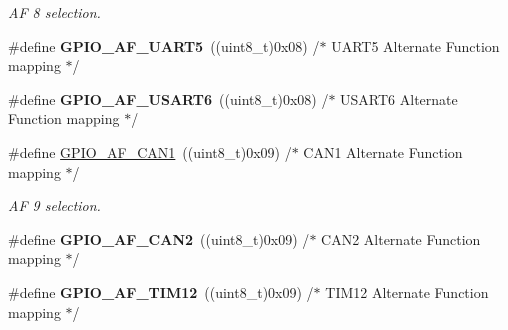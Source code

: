 \begin{DoxyCompactItemize}
\begin{DoxyCompactList}\small\item\em A\-F 8 selection. \end{DoxyCompactList}\item 
\hypertarget{group___g_p_i_o___alternat__function__selection__define_ga6250acb0f2f3de33bc8e78615852cc48}{\#define {\bfseries G\-P\-I\-O\-\_\-\-A\-F\-\_\-\-U\-A\-R\-T5}~((uint8\-\_\-t)0x08)  /$\ast$ U\-A\-R\-T5 Alternate Function mapping $\ast$/}\label{group___g_p_i_o___alternat__function__selection__define_ga6250acb0f2f3de33bc8e78615852cc48}

\item 
\hypertarget{group___g_p_i_o___alternat__function__selection__define_gaf69942861848b5175369145ffc001c41}{\#define {\bfseries G\-P\-I\-O\-\_\-\-A\-F\-\_\-\-U\-S\-A\-R\-T6}~((uint8\-\_\-t)0x08)  /$\ast$ U\-S\-A\-R\-T6 Alternate Function mapping $\ast$/}\label{group___g_p_i_o___alternat__function__selection__define_gaf69942861848b5175369145ffc001c41}

\item 
\hypertarget{group___g_p_i_o___alternat__function__selection__define_gaf5defeedc302bf348e31dd7bdcdd882f}{\#define \hyperlink{group___g_p_i_o___alternat__function__selection__define_gaf5defeedc302bf348e31dd7bdcdd882f}{G\-P\-I\-O\-\_\-\-A\-F\-\_\-\-C\-A\-N1}~((uint8\-\_\-t)0x09)  /$\ast$ C\-A\-N1 Alternate Function mapping $\ast$/}\label{group___g_p_i_o___alternat__function__selection__define_gaf5defeedc302bf348e31dd7bdcdd882f}

\begin{DoxyCompactList}\small\item\em A\-F 9 selection. \end{DoxyCompactList}\item 
\hypertarget{group___g_p_i_o___alternat__function__selection__define_ga4896d720d93f50f17207b4059ab5ebfb}{\#define {\bfseries G\-P\-I\-O\-\_\-\-A\-F\-\_\-\-C\-A\-N2}~((uint8\-\_\-t)0x09)  /$\ast$ C\-A\-N2 Alternate Function mapping $\ast$/}\label{group___g_p_i_o___alternat__function__selection__define_ga4896d720d93f50f17207b4059ab5ebfb}

\item 
\hypertarget{group___g_p_i_o___alternat__function__selection__define_ga681ff7964f5d73ed973a299383b13c90}{\#define {\bfseries G\-P\-I\-O\-\_\-\-A\-F\-\_\-\-T\-I\-M12}~((uint8\-\_\-t)0x09)  /$\ast$ T\-I\-M12 Alternate Function mapping $\ast$/}\label{group___g_p_i_o___alternat__function__selection__define_ga681ff7964f5d73ed973a299383b13c90}


\end{DoxyCompactItemize}

